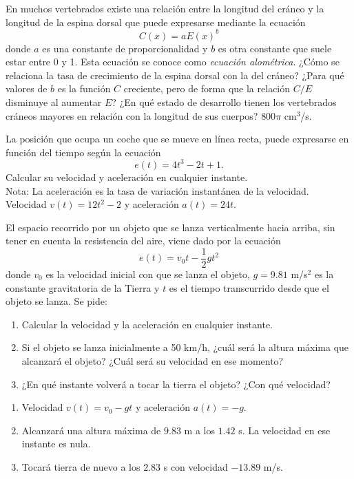 {En muchos vertebrados existe una relación entre la longitud del cráneo y la longitud de la espina dorsal que puede expresarse mediante la ecuación
\[
C(x) = a E(x)^b
\]
donde $a$ es una constante de proporcionalidad y $b$ es otra constante que suele estar entre 0 y 1.
Esta ecuación se conoce como \emph{ecuación alométrica}.
¿Cómo se relaciona la tasa de crecimiento de la espina dorsal con la del cráneo?
¿Para qué valores de $b$ es la función $C$ creciente, pero de forma que la relación $C/E$ disminuye al aumentar $E$?
¿En qué estado de desarrollo tienen los vertebrados cráneos mayores en relación con la longitud de sus cuerpos?
}
{$800\pi$ cm$^3$/s.
}
{
}


{La posición que ocupa un coche que se mueve en línea recta, puede expresarse en función del tiempo según la ecuación
\[
e(t) = 4t^3 -2t +1.
\]
Calcular su velocidad y aceleración en cualquier instante.\\
Nota: La aceleración es la tasa de variación instantánea de la velocidad.
}
{Velocidad $v(t)=12t^2-2$ y aceleración $a(t)=24t$.
}
{
}


{El espacio recorrido por un objeto que se lanza verticalmente hacia arriba, sin tener en cuenta la resistencia del aire, viene dado por la ecuación
\[
e(t) =v_0t-\frac{1}{2}gt^2
\]
donde $v_0$ es la velocidad inicial con que se lanza el objeto, $g=9.81$ m/s$^2$ es la constante gravitatoria de la Tierra y $t$ es el tiempo transcurrido desde que el objeto se lanza.
Se pide:
\begin{enumerate}
\item Calcular la velocidad y la aceleración en cualquier instante.
\item Si el objeto se lanza inicialmente a 50 km/h, ¿cuál será la altura máxima que alcanzará el objeto? ¿Cuál será su velocidad en ese
momento?
\item ¿En qué instante volverá a tocar la tierra el objeto? ¿Con qué velocidad?
\end{enumerate}
}
{\begin{enumerate}
\item Velocidad $v(t)=v_0-gt$ y aceleración $a(t)=-g$.
\item Alcanzará una altura máxima de $9.83$ m a los $1.42$ s. La velocidad en ese instante es nula.
\item Tocará tierra de nuevo a los $2.83$ s con velocidad $-13.89$ m/s.
\end{enumerate}
}
{
}



